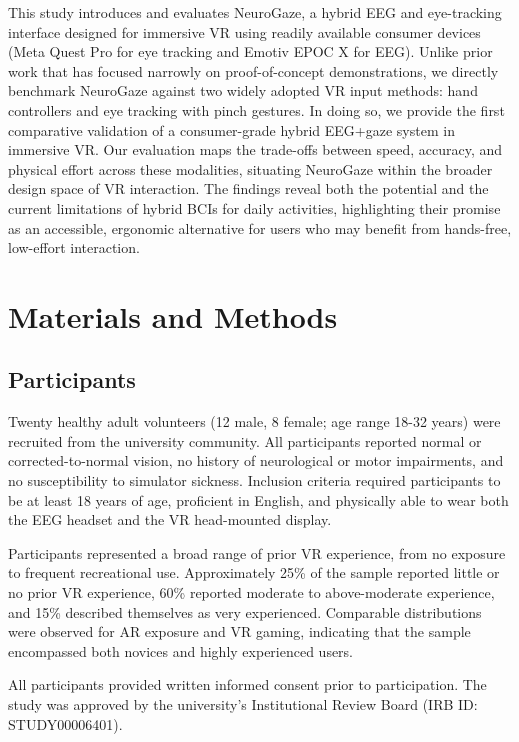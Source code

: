 \documentclass[utf8]{FrontiersinHarvard} %
\begin{document}
This study introduces and evaluates NeuroGaze, a hybrid EEG and eye-tracking interface designed for immersive VR using readily available consumer devices (Meta Quest Pro for eye tracking and Emotiv EPOC X for EEG). Unlike prior work that has focused narrowly on proof-of-concept demonstrations, we directly benchmark NeuroGaze against two widely adopted VR input methods: hand controllers and eye tracking with pinch gestures. In doing so, we provide the first comparative validation of a consumer-grade hybrid EEG+gaze system in immersive VR. Our evaluation maps the trade-offs between speed, accuracy, and physical effort across these modalities, situating NeuroGaze within the broader design space of VR interaction. The findings reveal both the potential and the current limitations of hybrid BCIs for daily activities, highlighting their promise as an accessible, ergonomic alternative for users who may benefit from hands-free, low-effort interaction.



\section{Materials and Methods}

\subsection{Participants}
Twenty healthy adult volunteers (12 male, 8 female; age range 18-32 years) were recruited from the university community. All participants reported normal or corrected-to-normal vision, no history of neurological or motor impairments, and no susceptibility to simulator sickness. Inclusion criteria required participants to be at least 18 years of age, proficient in English, and physically able to wear both the EEG headset and the VR head-mounted display.

Participants represented a broad range of prior VR experience, from no exposure to frequent recreational use. Approximately 25\% of the sample reported little or no prior VR experience, 60\% reported moderate to above-moderate experience, and 15\% described themselves as very experienced. Comparable distributions were observed for AR exposure and VR gaming, indicating that the sample encompassed both novices and highly experienced users. %

All participants provided written informed consent prior to participation. The study was approved by the university's Institutional Review Board (IRB ID: STUDY00006401).
\end{document}
